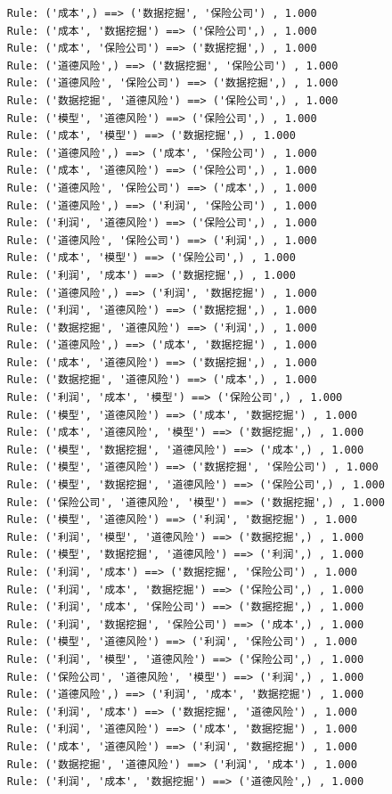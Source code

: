 \documentclass[lang=cn,11pt,a4paper,cite=authoryear]{elegantpaper}
\begin{document}
\begin{lstlisting}
	Rule: ('成本',) ==> ('数据挖掘', '保险公司') , 1.000
	Rule: ('成本', '数据挖掘') ==> ('保险公司',) , 1.000
	Rule: ('成本', '保险公司') ==> ('数据挖掘',) , 1.000
	Rule: ('道德风险',) ==> ('数据挖掘', '保险公司') , 1.000
	Rule: ('道德风险', '保险公司') ==> ('数据挖掘',) , 1.000
	Rule: ('数据挖掘', '道德风险') ==> ('保险公司',) , 1.000
	Rule: ('模型', '道德风险') ==> ('保险公司',) , 1.000
	Rule: ('成本', '模型') ==> ('数据挖掘',) , 1.000
	Rule: ('道德风险',) ==> ('成本', '保险公司') , 1.000
	Rule: ('成本', '道德风险') ==> ('保险公司',) , 1.000
	Rule: ('道德风险', '保险公司') ==> ('成本',) , 1.000
	Rule: ('道德风险',) ==> ('利润', '保险公司') , 1.000
	Rule: ('利润', '道德风险') ==> ('保险公司',) , 1.000
	Rule: ('道德风险', '保险公司') ==> ('利润',) , 1.000
	Rule: ('成本', '模型') ==> ('保险公司',) , 1.000
	Rule: ('利润', '成本') ==> ('数据挖掘',) , 1.000
	Rule: ('道德风险',) ==> ('利润', '数据挖掘') , 1.000
	Rule: ('利润', '道德风险') ==> ('数据挖掘',) , 1.000
	Rule: ('数据挖掘', '道德风险') ==> ('利润',) , 1.000
	Rule: ('道德风险',) ==> ('成本', '数据挖掘') , 1.000
	Rule: ('成本', '道德风险') ==> ('数据挖掘',) , 1.000
	Rule: ('数据挖掘', '道德风险') ==> ('成本',) , 1.000
	Rule: ('利润', '成本', '模型') ==> ('保险公司',) , 1.000
	Rule: ('模型', '道德风险') ==> ('成本', '数据挖掘') , 1.000
	Rule: ('成本', '道德风险', '模型') ==> ('数据挖掘',) , 1.000
	Rule: ('模型', '数据挖掘', '道德风险') ==> ('成本',) , 1.000
	Rule: ('模型', '道德风险') ==> ('数据挖掘', '保险公司') , 1.000
	Rule: ('模型', '数据挖掘', '道德风险') ==> ('保险公司',) , 1.000
	Rule: ('保险公司', '道德风险', '模型') ==> ('数据挖掘',) , 1.000
	Rule: ('模型', '道德风险') ==> ('利润', '数据挖掘') , 1.000
	Rule: ('利润', '模型', '道德风险') ==> ('数据挖掘',) , 1.000
	Rule: ('模型', '数据挖掘', '道德风险') ==> ('利润',) , 1.000
	Rule: ('利润', '成本') ==> ('数据挖掘', '保险公司') , 1.000
	Rule: ('利润', '成本', '数据挖掘') ==> ('保险公司',) , 1.000
	Rule: ('利润', '成本', '保险公司') ==> ('数据挖掘',) , 1.000
	Rule: ('利润', '数据挖掘', '保险公司') ==> ('成本',) , 1.000
	Rule: ('模型', '道德风险') ==> ('利润', '保险公司') , 1.000
	Rule: ('利润', '模型', '道德风险') ==> ('保险公司',) , 1.000
	Rule: ('保险公司', '道德风险', '模型') ==> ('利润',) , 1.000
	Rule: ('道德风险',) ==> ('利润', '成本', '数据挖掘') , 1.000
	Rule: ('利润', '成本') ==> ('数据挖掘', '道德风险') , 1.000
	Rule: ('利润', '道德风险') ==> ('成本', '数据挖掘') , 1.000
	Rule: ('成本', '道德风险') ==> ('利润', '数据挖掘') , 1.000
	Rule: ('数据挖掘', '道德风险') ==> ('利润', '成本') , 1.000
	Rule: ('利润', '成本', '数据挖掘') ==> ('道德风险',) , 1.000

\end{lstlisting}
\end{document}
